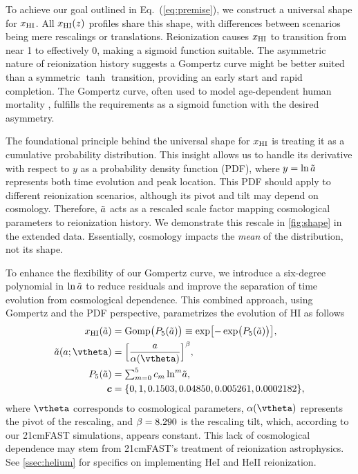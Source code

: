 To achieve our goal outlined in Eq.~(\ref{eq:premise}), we construct a
universal shape for $x_{\mathrm{HI}}$.
All $x_{\mathrm{HI}}(z)$ profiles share this shape, with differences between
scenarios being mere rescalings or translations.
Reionization causes $x_{\mathrm{HI}}$ to transition from near 1 to effectively 0,
making a sigmoid function suitable.
The asymmetric nature of reionization history
\cite{Trac2018, Doussot2019} suggests a Gompertz curve might be better
suited than a symmetric $\tanh$ transition, providing an early start and
rapid completion.
The Gompertz curve, often used to model age-dependent human mortality
\cite{Gompertz1825}, fulfills the requirements as a sigmoid function
with the desired asymmetry.

The foundational principle behind the universal shape for $x_{\mathrm{HI}}$ is
treating it as a cumulative probability distribution.
This insight allows us to handle its derivative with respect to $y$ as a
probability density function (PDF), where $y = \ln\tilde{a}$ represents both
time evolution and peak location.
This PDF should apply to different reionization scenarios, although its
pivot and tilt may depend on cosmology.
Therefore, $\tilde{a}$ acts as a rescaled scale factor mapping cosmological
parameters to reionization history.
We demonstrate this rescale in \autoref{fig:shape} in the extended data.
Essentially, cosmology impacts the \emph{mean} of the distribution, not
its shape.

To enhance the flexibility of our Gompertz curve, we introduce a
six-degree polynomial in $\ln\tilde{a}$ to reduce residuals and improve the
separation of time evolution from cosmological dependence.
This combined approach, using Gompertz and the PDF perspective,
parametrizes the evolution of HI as follows
%
\begin{align}
\label{eq:uni}
x_\HI(\ar) &= \Gomp\bigl( P_5(\ar) \bigr)
  \equiv \exp\bigl[ - \exp\bigl( P_5(\ar) \bigr) \bigr], \\
%
\label{eq:map}
\ar(a; \vtheta) &= \Bigl[ \frac{a}{\ap(\vtheta)} \Bigr]^\tilt ,\\
%
\label{eq:poly}
P_5(\ar) &= {\textstyle\sum}_{m=0}^5 \, c_m \ln^m\!\ar, \\
%
\nonumber
\bm{c} &= \{0, 1, 0.1503, 0.04850, 0.005261, 0.0002182\},
\end{align}
%
where $\vtheta$ corresponds to cosmological parameters, $\ap(\vtheta)$
represents the pivot of the rescaling, and $\beta = 8.290$ is the
rescaling tilt, which, according to our 21cmFAST simulations, appears
constant.
This lack of cosmological dependence may stem from 21cmFAST's treatment
of reionization astrophysics.
See \ref{ssec:helium} for specifics on implementing HeI and HeII
reionization.

